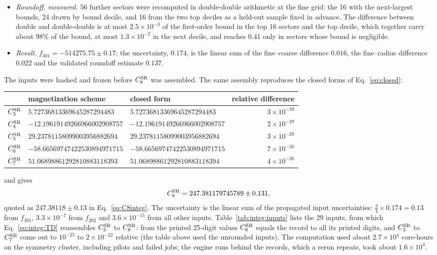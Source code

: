 \documentclass[11pt,a4paper]{article}
\numberwithin{equation}{section}
\newcommand{\CSR}{C^{\rm SR}}
\newcommand{\sci}[2]{#1\times10^{#2}}
\begin{document}
\begin{itemize}
 A of Appendix~\ref{app:integ:disclosures}).
\item \emph{Roundoff, measured.} 56 further sectors were recomputed in double-double arithmetic at the fine grid: the
 16 with the next-largest bounds, 24 drawn by bound decile, and 16 from the two top deciles as a held-out sample fixed
 in advance. The difference between double and double-double is at most $\sci{2.5}{-3}$ of the first-order bound in the
 top 16 sectors and the top decile, which together carry about 98\% of the bound, at most $\sci{1.3}{-2}$ in the next
 decile, and reaches $0.41$ only in sectors whose bound is negligible.
\item \emph{Result.} $f_{301}=-514275.75\pm0.17$; the uncertainty, $0.174$, is the linear sum of the fine--coarse difference $0.016$, the
 fine--radius difference $0.022$ and the validated roundoff estimate $0.137$.
\end{itemize}
The inputs were hashed and frozen before $\CSR_8$ was assembled. The same assembly reproduces the closed forms of
Eq.~\eqref{eq:closed}:
\begin{center}\small
\begin{tabular}{@{}lllr@{}}
\toprule
& magnetization scheme & closed form & relative difference\\
\midrule
$\CSR_3$ & $5.72736813369645287294483$ & $5.72736813369645287294483$ & $\sci{3}{-39}$\\
$\CSR_4$ & $-12.19619149266966002908757$ & $-12.19619149266966002908757$ & $\sci{2}{-29}$\\
$\CSR_5$ & $29.23781158099003956882694$ & $29.23781158099003956882694$ & $\sci{3}{-28}$\\
$\CSR_6$ & $-58.66569747422530894971715$ & $-58.66569747422530894971715$ & $\sci{7}{-26}$\\
$\CSR_7$ & $51.06898861292810883118393$ & $51.06898861292810883118394$ & $\sci{4}{-26}$\\
\bottomrule
\end{tabular}
\end{center}
and gives
\begin{equation}
 \CSR_8=247.381179745789\pm0.131,
\end{equation}
quoted as $247.38118\pm0.13$ in Eq.~\eqref{eq:C8integ}. The uncertainty is the linear sum of the propagated input
uncertainties: $\frac34\times0.174=0.13$ from $f_{301}$, $\sci{3.3}{-7}$ from $f_{202}$ and $\sci{3.6}{-15}$ from all
other inputs. Table~\ref{tab:integ:inputs} lists the 29 inputs, from which Eq.~\eqref{eq:integ:TD} reassembles
$\CSR_3$ to $\CSR_8$: from the printed 25-digit values $\CSR_8$ equals the record to all its printed digits, and
$\CSR_3$ to $\CSR_7$ come out to $10^{-25}$ to $\sci{2}{-22}$ relative (the table above used the unrounded inputs). The computation used about $\sci{2.7}{4}$ core-hours on the symmetry cluster, including pilots and failed jobs; the
engine runs behind the records, which a rerun repeats, took about $\sci{1.6}{4}$.
\end{document}
